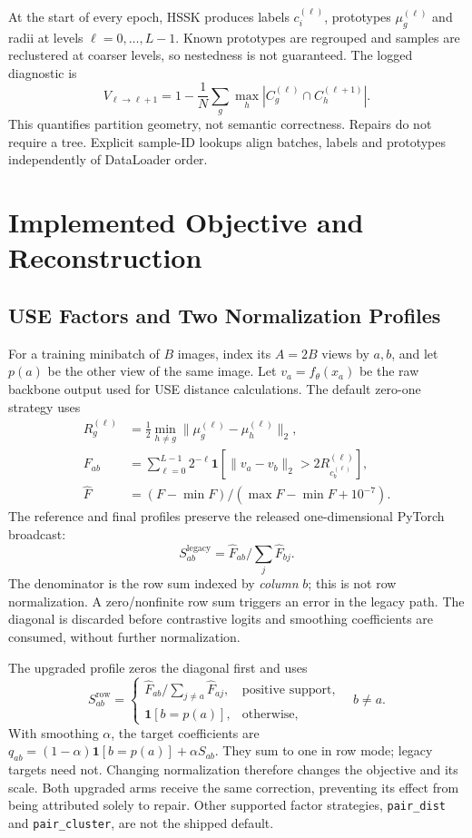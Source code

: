 \documentclass[conference]{IEEEtran}
\newcommand{\code}[1]{\texttt{#1}}
\newcommand{\ind}{\mathbf{1}}
\begin{document}
At the start of every epoch, HSSK produces labels $c_i^{(\ell)}$, prototypes $\mu_g^{(\ell)}$ and radii at levels $\ell=0,\ldots,L-1$. Known prototypes are regrouped and samples are reclustered at coarser levels, so nestedness is not guaranteed. The logged diagnostic is
\begin{equation}\label{eq:nested}
V_{\ell\to\ell+1}=1-\frac1N\sum_g\max_h
|C_g^{(\ell)}\cap C_h^{(\ell+1)}|.
\end{equation}
This quantifies partition geometry, not semantic correctness. Repairs do not require a tree. Explicit sample-ID lookups align batches, labels and prototypes independently of DataLoader order.

\section{Implemented Objective and Reconstruction}
\subsection{USE Factors and Two Normalization Profiles}
For a training minibatch of $B$ images, index its $A=2B$ views by $a,b$, and let $p(a)$ be the other view of the same image. Let $v_a=f_\theta(x_a)$ be the raw backbone output used for USE distance calculations. The default zero-one strategy uses
\begin{align}
R_g^{(\ell)}&=\tfrac12\min_{h\ne g}\|\mu_g^{(\ell)}-\mu_h^{(\ell)}\|_2,\\
F_{ab}&=\sum_{\ell=0}^{L-1}2^{-\ell}
\ind[\|v_a-v_b\|_2>2R_{c_b^{(\ell)}}^{(\ell)}],\\
\widehat F&=(F-\min F)/(\max F-\min F+10^{-7}).
\end{align}
The reference and final profiles preserve the released one-dimensional PyTorch broadcast:
\begin{equation}\label{eq:legacy}
S^{\mathrm{legacy}}_{ab}=\widehat F_{ab}\big/\sum_j\widehat F_{bj}.
\end{equation}
The denominator is the row sum indexed by \emph{column} $b$; this is not row normalization. A zero/nonfinite row sum triggers an error in the legacy path. The diagonal is discarded before contrastive logits and smoothing coefficients are consumed, without further normalization.

The upgraded profile zeros the diagonal first and uses
\begin{equation}\label{eq:row}
S^{\mathrm{row}}_{ab}=\begin{cases}
\widehat F_{ab}/\sum_{j\ne a}\widehat F_{aj},&\text{positive support},\\
\ind[b=p(a)],&\text{otherwise},
\end{cases}\quad b\ne a.
\end{equation}
With smoothing $\alpha$, the target coefficients are
$q_{ab}=(1-\alpha)\ind[b=p(a)]+\alpha S_{ab}$. They sum to one in row mode; legacy targets need not. Changing normalization therefore changes the objective and its scale. Both upgraded arms receive the same correction, preventing its effect from being attributed solely to repair. Other supported factor strategies, \code{pair\_dist} and \code{pair\_cluster}, are not the shipped default.
\end{document}
